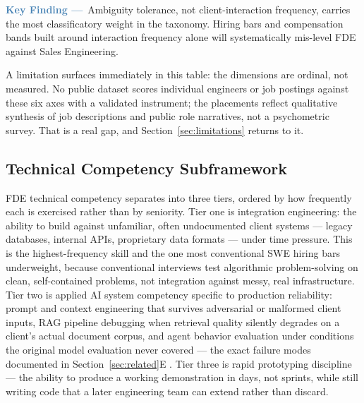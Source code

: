 \documentclass[journal]{IEEEtran}
\begin{document}
\begin{mdframed}[linecolor=steelblue, linewidth=1.2pt, backgroundcolor=steelblue!6,
  innerleftmargin=8pt, innerrightmargin=8pt, innertopmargin=6pt, innerbottommargin=6pt,
  roundcorner=4pt]
\noindent\textbf{\textcolor{steelblue}{Key Finding ---}}~Ambiguity tolerance, not client-interaction frequency, carries the most classificatory weight in the taxonomy. Hiring bars and compensation bands built around interaction frequency alone will systematically mis-level FDE against Sales Engineering.
\end{mdframed}

A limitation surfaces immediately in this table: the dimensions are ordinal, not measured. No public dataset scores individual engineers or job postings against these six axes with a validated instrument; the placements reflect qualitative synthesis of job descriptions and public role narratives, not a psychometric survey. That is a real gap, and Section~\ref{sec:limitations} returns to it.

\subsection{Technical Competency Subframework}

FDE technical competency separates into three tiers, ordered by how frequently each is exercised rather than by seniority. Tier one is integration engineering: the ability to build against unfamiliar, often undocumented client systems --- legacy databases, internal APIs, proprietary data formats --- under time pressure. This is the highest-frequency skill and the one most conventional SWE hiring bars underweight, because conventional interviews test algorithmic problem-solving on clean, self-contained problems, not integration against messy, real infrastructure. Tier two is applied AI system competency specific to production reliability: prompt and context engineering that survives adversarial or malformed client inputs, RAG pipeline debugging when retrieval quality silently degrades on a client's actual document corpus, and agent behavior evaluation under conditions the original model evaluation never covered --- the exact failure modes documented in Section~\ref{sec:related}E \cite{karakurt2026rag,mohammadi2025llmagentsurvey,wang2025llmagentdataanalysis,brehme2025ragtrust}. Tier three is rapid prototyping discipline --- the ability to produce a working demonstration in days, not sprints, while still writing code that a later engineering team can extend rather than discard.
\end{document}

